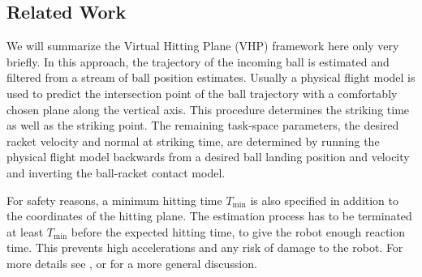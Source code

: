 \subsection{Related Work}\label{relatedWork}

We will summarize the Virtual Hitting Plane (VHP) framework here only very briefly. In this approach, the trajectory of the incoming ball is estimated and filtered from a stream of ball position estimates. Usually a physical flight model is used to predict the intersection point of the ball trajectory with a comfortably chosen plane along the vertical axis. This procedure determines the striking time as well as the striking point. The remaining task-space parameters, the desired racket velocity and normal at striking time, are determined by running the physical flight model backwards from a desired ball landing position and velocity and inverting the ball-racket contact model.

For safety reasons, a minimum hitting time $T_{\mathrm{min}}$ is also specified in addition to the coordinates of the hitting plane. The estimation process has to be terminated at least $T_{\mathrm{min}}$ before the expected hitting time, to give the robot enough reaction time. This prevents high accelerations and any risk of damage to the robot. For more details see \cite{Muelling13}, or \cite{Matsushima05} for a more general discussion. 


